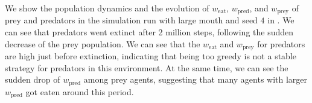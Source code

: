 \documentclass[dvipsnames,format=sigconf]{acmart}
\newcommand{\1}{\mathbb{I} } %
\begin{document}
We show the population dynamics and the evolution of $w_\mathrm{eat}$, $w_\mathrm{pred}$, and $w_\mathrm{prey}$ of prey and predators in the simulation run with large mouth and seed $4$ in . We can see that predators went extinct after 2 million steps, following the sudden decrease of the prey population. We can see that the $w_\mathrm{eat}$ and $w_\mathrm{prey}$ for predators are high just before extinction, indicating that being too greedy is not a stable strategy for predators in this environment. At the same time, we can see the sudden drop of $w_\mathrm{pred}$ among prey agents, suggesting that many agents with larger $w_\mathrm{pred}$ got eaten around this period.
\end{document}
